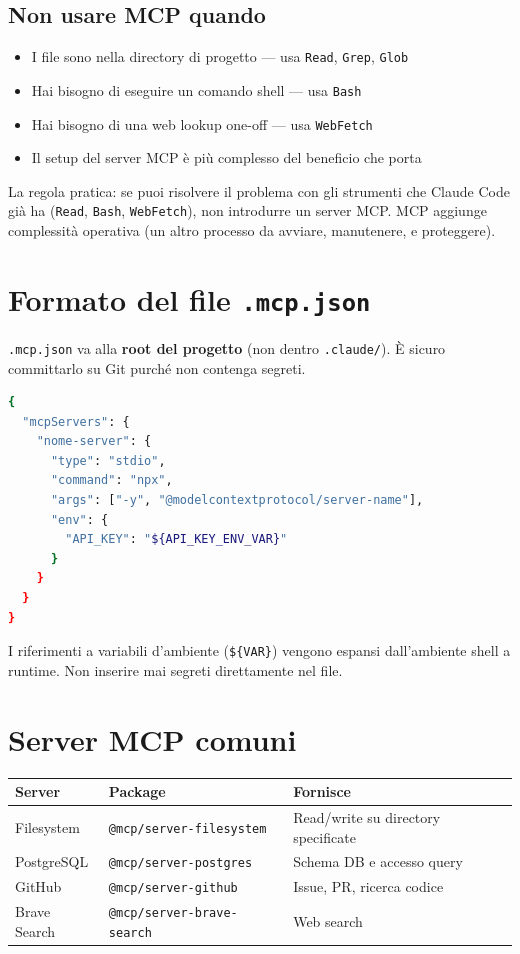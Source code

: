 \documentclass[12pt,a4paper,twoside]{book}
\begin{document}
\subsection{Non usare MCP quando}

\begin{itemize}
  \item I file sono nella directory di progetto — usa \texttt{Read}, \texttt{Grep}, \texttt{Glob}
  \item Hai bisogno di eseguire un comando shell — usa \texttt{Bash}
  \item Hai bisogno di una web lookup one-off — usa \texttt{WebFetch}
  \item Il setup del server MCP è più complesso del beneficio che porta
\end{itemize}

\begin{buonapratica}
La regola pratica: se puoi risolvere il problema con gli strumenti che Claude Code già ha (\texttt{Read}, \texttt{Bash}, \texttt{WebFetch}), non introdurre un server MCP. MCP aggiunge complessità operativa (un altro processo da avviare, manutenere, e proteggere).
\end{buonapratica}

\section{Formato del file \texttt{.mcp.json}}

\texttt{.mcp.json} va alla \textbf{root del progetto} (non dentro \texttt{.claude/}). È sicuro committarlo su Git purché non contenga segreti.

\begin{lstlisting}[language=bash]
{
  "mcpServers": {
    "nome-server": {
      "type": "stdio",
      "command": "npx",
      "args": ["-y", "@modelcontextprotocol/server-name"],
      "env": {
        "API_KEY": "${API_KEY_ENV_VAR}"
      }
    }
  }
}
\end{lstlisting}

I riferimenti a variabili d'ambiente (\texttt{\$\{VAR\}}) vengono espansi dall'ambiente shell a runtime. Non inserire mai segreti direttamente nel file.

\section{Server MCP comuni}

\begin{center}
\begin{tabular}{lll}
\toprule
\textbf{Server} & \textbf{Package} & \textbf{Fornisce} \\
\midrule
Filesystem & \texttt{@mcp/server-filesystem} & Read/write su directory specificate \\
PostgreSQL & \texttt{@mcp/server-postgres} & Schema DB e accesso query \\
GitHub & \texttt{@mcp/server-github} & Issue, PR, ricerca codice \\
Brave Search & \texttt{@mcp/server-brave-search} & Web search \\
\bottomrule
\end{tabular}
\end{center}
\end{document}
